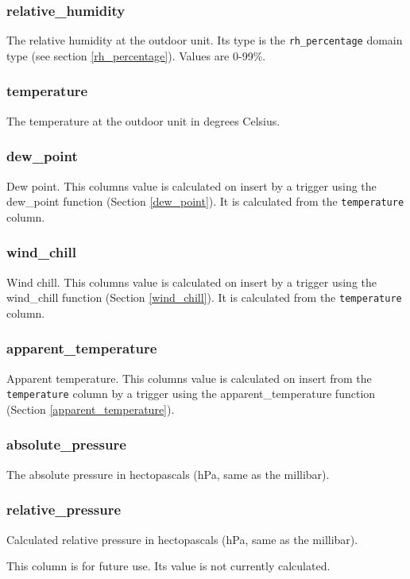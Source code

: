 \documentclass[a4paper,10pt]{book}
\begin{document}
\subsubsection{relative\_humidity}
The relative humidity at the outdoor unit. Its type is the \verb|rh_percentage| domain type (see section \ref{rh_percentage}). Values are 0-99\%.

\subsubsection{temperature}
The temperature at the outdoor unit in degrees Celsius.

\subsubsection{dew\_point}
Dew point. This columns value is calculated on insert by a trigger using the dew\_point function (Section \ref{dew_point}). It is calculated from the \verb|temperature| column.

\subsubsection{wind\_chill}
Wind chill. This columns value is calculated on insert by a trigger using the wind\_chill function (Section \ref{wind_chill}). It is calculated from the \verb|temperature| column.

\subsubsection{apparent\_temperature}
Apparent temperature. This columns value is calculated on insert from the \verb|temperature| column by a trigger using the apparent\_temperature function (Section \ref{apparent_temperature}).

\subsubsection{absolute\_pressure}
The absolute pressure in hectopascals (hPa, same as the millibar).

\subsubsection{relative\_pressure}
Calculated relative pressure in hectopascals (hPa, same as the millibar).

This column is for future use. Its value is not currently calculated.
\end{document}

